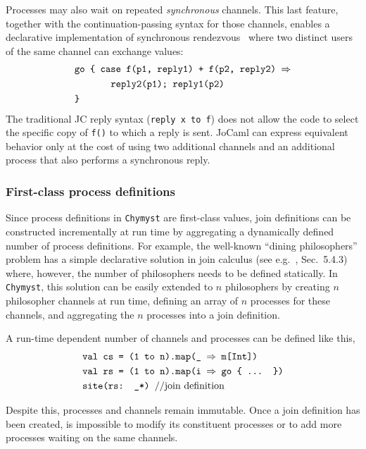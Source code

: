 \documentclass[sigplan,10pt,review,anonymous]{acmart}\settopmatter{printfolios=true}
\begin{document}
Processes may also wait on repeated \emph{synchronous} channels. This
last feature, together with the continuation-passing syntax for those
channels, enables a declarative implementation of synchronous rendezvous~\citep{Mil1999}
where two distinct users of the same channel can exchange values:
\begin{align*}
 & \text{\texttt{go \{ case f(p1, reply1) + f(p2, reply2) \ensuremath{\Rightarrow}}}\\
 & \text{\texttt{ ~ ~ ~ reply2(p1); reply1(p2)}}\\
 & \text{\texttt{\}}}
\end{align*}
The traditional JC reply syntax (\texttt{reply x to f}) does not allow
the code to select the specific copy of \texttt{f()} to which a reply
is sent. JoCaml can express equivalent behavior only at the cost of
using two additional channels and an additional process that also
performs a synchronous reply. 

\subsubsection{First-class process definitions\label{subsec:First-class-process-definitions}}

Since process definitions in \texttt{Chymyst} are first-class values,
join definitions can be constructed incrementally at run time by aggregating
a dynamically defined number of process definitions. For example,
the well-known ``dining philosophers'' problem has a simple declarative
solution in join calculus (see e.g.~\citep{VarAgh2013}, Sec.~5.4.3)
where, however, the number of philosophers needs to be defined statically.
In \texttt{Chymyst}, this solution can be easily extended to $n$
philosophers by creating $n$ philosopher channels at run time, defining
an array of $n$ processes for these channels, and aggregating the
$n$ processes into a join definition. 

A run-time dependent number of channels and processes can be defined
like this,
\begin{align*}
 & \text{\texttt{val cs = (1 to n).map(\_ \ensuremath{\Rightarrow} m[Int])}}\\
 & \text{\texttt{val rs = (1 to n).map(i \ensuremath{\Rightarrow} go \{ ... \})}}\\
 & \text{\texttt{site(rs: \_*) \textnormal{//join definition}}}
\end{align*}

Despite this, processes and channels remain immutable. Once a join
definition has been created, is impossible to modify its constituent
processes or to add more processes waiting on the same channels.
\end{document}
